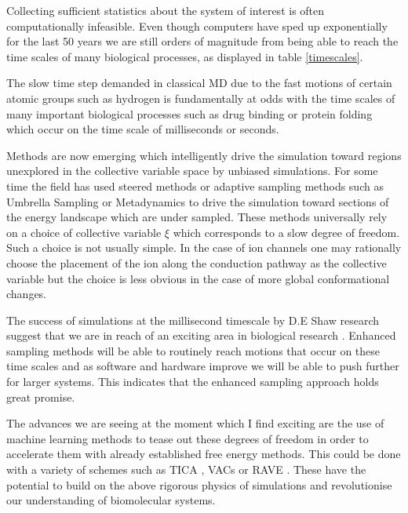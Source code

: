 Collecting sufficient statistics about the system of interest is often computationally infeasible. Even though computers have sped up exponentially for the last 50 years we are still orders of magnitude from being able to reach the time scales of many biological processes, as displayed in table \ref{timescales}.

The slow time step demanded in classical MD due to the fast motions of certain atomic groups such as hydrogen is fundamentally at odds with the time scales of many important biological processes such as drug binding or protein folding which occur on the time scale of  milliseconds or seconds.  

Methods are now emerging which intelligently drive the simulation toward regions unexplored in the collective variable space by unbiased simulations. For some time the field has used steered methods or adaptive sampling methods such as Umbrella Sampling or Metadynamics to drive the simulation toward sections of the energy landscape which are under sampled. These methods universally rely on a choice of collective variable $\xi$ which corresponds to a slow degree of freedom. Such a choice is not usually simple. In the case of ion channels one may rationally choose the placement of the ion along the conduction pathway as the collective variable but the choice is less obvious in the case of more global conformational changes.

The success of simulations at the millisecond timescale by D.E Shaw research suggest that we are in reach of an exciting area in biological research \cite{lindorff-larsen2016}. Enhanced sampling methods will be able to routinely reach motions that occur on these time scales and as software and hardware improve we will be able to push further for larger systems. This indicates that the enhanced sampling approach holds great promise.

The advances we are seeing at the moment which I find exciting are the use of machine learning methods to tease out these degrees of freedom in order to accelerate them with already established free energy methods. This could be done with a variety of schemes such as TICA \cite{noe2001}\cite{schultze2021}, VACs \cite{brotzakis2019} or RAVE \cite{ribeiro2018}. These have the potential to build on the above rigorous physics of simulations and revolutionise our understanding of biomolecular systems. 

